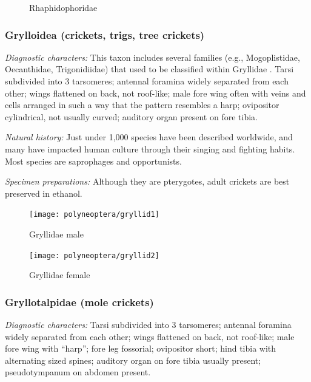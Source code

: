 \begin{figure}[ht!]
  \centering
  \caption{Rhaphidophoridae \citep[modified from][Fig. 25]{bhlitem15767}}
  \label{fig:rhaphid}
\end{figure}

\subsubsection{Grylloidea (crickets, trigs, tree crickets)}
\noindent{}\textit{Diagnostic characters:} This taxon includes several families (e.g., Mogoplistidae, Oecanthidae, Trigonidiidae) that used to be classified within Gryllidae \citep{orthspecfile}. Tarsi subdivided into 3 tarsomeres; antennal foramina widely separated from each other; wings flattened on back, not roof-like; male fore wing often with veins and cells arranged in such a way that the pattern resembles a harp; ovipositor cylindrical, not usually curved; auditory organ present on fore tibia.\vspace{3mm}

\noindent{}\textit{Natural history:} Just under 1,000 species have been described worldwide, and many have impacted human culture through their singing and fighting habits. Most species are saprophages and opportunists.\vspace{3mm}

\noindent{}\textit{Specimen preparations:} Although they are pterygotes, adult crickets are best preserved in ethanol.\vspace{3mm}
\begin{figure}[ht!]
  \centering
    \texttt{[image: polyneoptera/gryllid1]}
  \caption{Gryllidae male \citep[modified from][Fig. 442]{leunis1877synopsis}}
  \label{fig:gryllidMale}
\end{figure}

\begin{figure}[ht!]
  \centering
    \texttt{[image: polyneoptera/gryllid2]}
  \caption{Gryllidae female \citep[modified from][Fig. 221]{kellogg1906american}}
  \label{fig:gryllid}
\end{figure}

\subsubsection{Gryllotalpidae (mole crickets)}
\noindent{}\textit{Diagnostic characters:} Tarsi subdivided into 3 tarsomeres; antennal foramina widely separated from each other; wings flattened on back, not roof-like; male fore wing with ``harp''; fore leg fossorial; ovipositor short; hind tibia with alternating sized spines; auditory organ on fore tibia usually present; pseudotympanum on abdomen present.\vspace{3mm}


